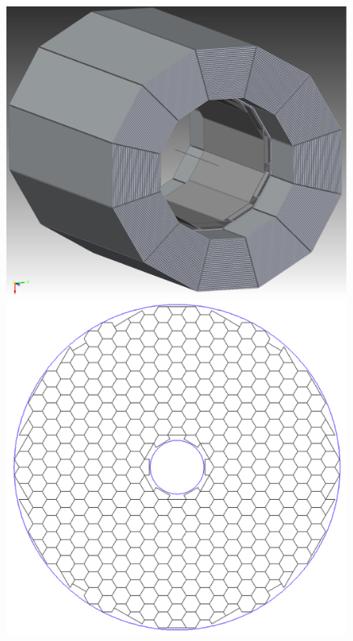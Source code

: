 \begin{figure}
	\begin{minipage}[b]{.49\textwidth}
		\includegraphics[width=\linewidth]{Calorimeter/SiliconTungstenSiD/HCalECal}
		\caption{}
		\label{fig:Calorimeter:SiDECAL:HCalECal}
	\end{minipage}\hfill
	\begin{minipage}[b]{.49\textwidth}
		\includegraphics[width=\linewidth]{Calorimeter/SiliconTungstenSiD/endcapLayout}
		\caption{}
		\label{fig:Calorimeter:SiDECAL:endcapLayout}
	\end{minipage}
\end{figure}


